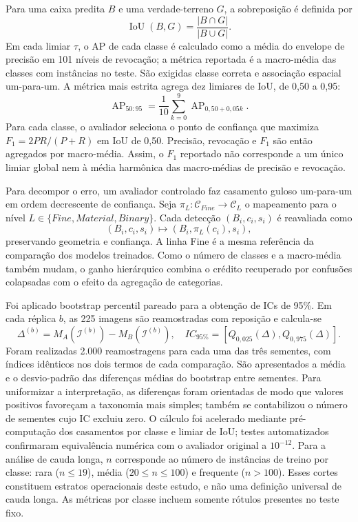 Para uma caixa predita $B$ e uma verdade-terreno $G$, a sobreposição é definida por
\begin{equation}
  \operatorname{IoU}(B,G)=\frac{|B\cap G|}{|B\cup G|}.
  \label{eq:iou}
\end{equation}
Em cada limiar $\tau$, o AP de cada classe é calculado como a média do envelope de precisão em 101 níveis de revocação; a métrica reportada é a macro-média das classes com instâncias no teste. São exigidas classe correta e associação espacial um-para-um. A métrica mais estrita agrega dez limiares de IoU, de 0,50 a 0,95:
\begin{equation}
  \operatorname{AP}_{50:95}=\frac{1}{10}\sum_{k=0}^{9}
  \operatorname{AP}_{0{,}50+0{,}05k}.
  \label{eq:map}
\end{equation}
Para cada classe, o avaliador seleciona o ponto de confiança que maximiza $F_1=2PR/(P+R)$ em IoU de 0,50. Precisão, revocação e $F_1$ são então agregados por macro-média. Assim, o $F_1$ reportado não corresponde a um único limiar global nem à média harmônica das macro-médias de precisão e revocação.

Para decompor o erro, um avaliador controlado faz casamento guloso um-para-um em ordem decrescente de confiança. Seja $\pi_L:\mathcal{C}_{Fine}\rightarrow\mathcal{C}_L$ o mapeamento para o nível $L\in\{Fine,Material,Binary\}$. Cada detecção $(B_i,c_i,s_i)$ é reavaliada como
\begin{equation}
  (B_i,c_i,s_i)\mapsto(B_i,\pi_L(c_i),s_i),
  \label{eq:remap}
\end{equation}
preservando geometria e confiança. A linha Fine é a mesma referência da comparação dos modelos treinados. Como o número de classes e a macro-média também mudam, o ganho hierárquico combina o crédito recuperado por confusões colapsadas com o efeito da agregação de categorias.

Foi aplicado bootstrap percentil pareado \cite{efron1993bootstrap} para a obtenção de ICs de 95\%. Em cada réplica $b$, as 225 imagens são reamostradas com reposição e calcula-se
\begin{equation}
  \Delta^{(b)}=M_A(\mathcal{I}^{(b)})-M_B(\mathcal{I}^{(b)}),\quad
  IC_{95\%}=[Q_{0{,}025}(\Delta),Q_{0{,}975}(\Delta)].
  \label{eq:bootstrap}
\end{equation}
Foram realizadas 2.000 reamostragens para cada uma das três sementes, com índices idênticos nos dois termos de cada comparação. São apresentados a média e o desvio-padrão das diferenças médias do bootstrap entre sementes. Para uniformizar a interpretação, as diferenças foram orientadas de modo que valores positivos favoreçam a taxonomia mais simples; também se contabilizou o número de sementes cujo IC excluiu zero. O cálculo foi acelerado mediante pré-computação dos casamentos por classe e limiar de IoU; testes automatizados confirmaram equivalência numérica com o avaliador original a $10^{-12}$. Para a análise de cauda longa, $n$ corresponde ao número de instâncias de treino por classe: rara ($n\leq19$), média ($20\leq n\leq100$) e frequente ($n>100$). Esses cortes constituem estratos operacionais deste estudo, e não uma definição universal de cauda longa. As métricas por classe incluem somente rótulos presentes no teste fixo.
